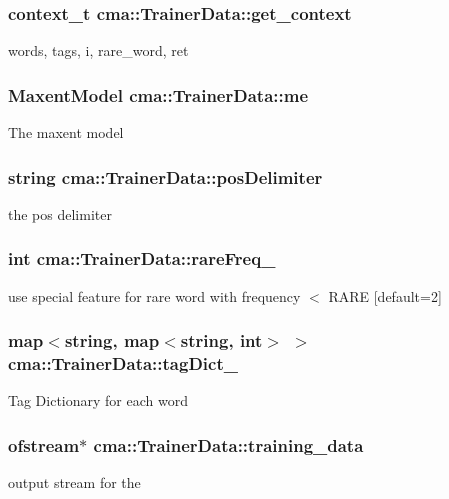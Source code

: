 \subsubsection[{get\_\-context}]{\setlength{\rightskip}{0pt plus 5cm}context\_\-t {\bf cma::TrainerData::get\_\-context}}\label{classcma_1_1TrainerData_a6a4496484d04a90c61f201011536d8c2}
words, tags, i, rare\_\-word, ret 
\subsubsection[{me}]{\setlength{\rightskip}{0pt plus 5cm}MaxentModel {\bf cma::TrainerData::me}}\label{classcma_1_1TrainerData_aeebdd898115e74ed985c5b776bbb3074}
The maxent model 
\subsubsection[{posDelimiter}]{\setlength{\rightskip}{0pt plus 5cm}string {\bf cma::TrainerData::posDelimiter}}\label{classcma_1_1TrainerData_a24b6c6f09b1ffe2c5228730901147224}
the pos delimiter 
\subsubsection[{rareFreq\_\-}]{\setlength{\rightskip}{0pt plus 5cm}int {\bf cma::TrainerData::rareFreq\_\-}}\label{classcma_1_1TrainerData_ac13b7242d3736c2d40772d093fc91a18}
use special feature for rare word with frequency $<$ RARE [default=2] 
\subsubsection[{tagDict\_\-}]{\setlength{\rightskip}{0pt plus 5cm}map$<$string, map$<$string, int$>$ $>$ {\bf cma::TrainerData::tagDict\_\-}}\label{classcma_1_1TrainerData_a9ecba8810e62c9a6bfb7446264654a28}
Tag Dictionary for each word 
\subsubsection[{training\_\-data}]{\setlength{\rightskip}{0pt plus 5cm}ofstream$\ast$ {\bf cma::TrainerData::training\_\-data}}\label{classcma_1_1TrainerData_abeca151a5af14873ecd25be4ff926d24}
output stream for the 
